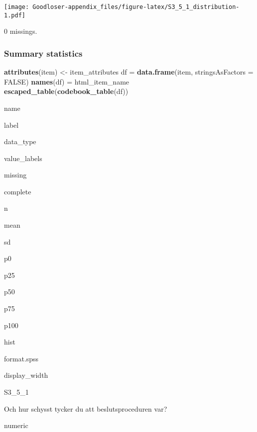 \documentclass[]{book}
\newenvironment{Shaded}{\begin{snugshade}}{\end{snugshade}}
\newcommand{\KeywordTok}[1]{\textcolor[rgb]{0.13,0.29,0.53}{\textbf{#1}}}
\newcommand{\DataTypeTok}[1]{\textcolor[rgb]{0.13,0.29,0.53}{#1}}
\newcommand{\StringTok}[1]{\textcolor[rgb]{0.31,0.60,0.02}{#1}}
\newcommand{\OtherTok}[1]{\textcolor[rgb]{0.56,0.35,0.01}{#1}}
\newcommand{\OperatorTok}[1]{\textcolor[rgb]{0.81,0.36,0.00}{\textbf{#1}}}
\newcommand{\NormalTok}[1]{#1}
\begin{document}
\texttt{[image: Goodloser-appendix\_files/figure-latex/S3\_5\_1\_distribution-1.pdf]}

\begin{Shaded}
\end{Shaded}

0 missings.

\subsubsection{Summary statistics}\label{S3_5_1_summary}

\begin{Shaded}
\begin{Highlighting}[]
\KeywordTok{attributes}\NormalTok{(item) <-}\StringTok{ }\NormalTok{item_attributes}
\NormalTok{df =}\StringTok{ }\KeywordTok{data.frame}\NormalTok{(item, }\DataTypeTok{stringsAsFactors =} \OtherTok{FALSE}\NormalTok{)}
\KeywordTok{names}\NormalTok{(df) =}\StringTok{ }\NormalTok{html_item_name}
\KeywordTok{escaped_table}\NormalTok{(}\KeywordTok{codebook_table}\NormalTok{(df))}
\end{Highlighting}
\end{Shaded}

name

label

data\_type

value\_labels

missing

complete

n

mean

sd

p0

p25

p50

p75

p100

hist

format.spss

display\_width

S3\_5\_1

Och hur schysst tycker du att beslutsproceduren var?

numeric
\end{document}

